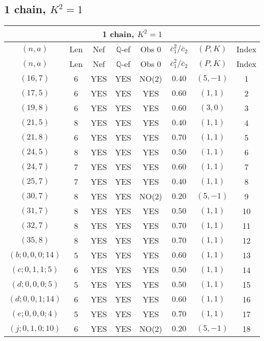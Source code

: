 \subsection{1 chain, $K^2 = 1$}
\begin{longtable}{|c|c|c|c|c|c|c|c|}
\hline
\multicolumn{8}{|c|}{1 chain, $K^2 = 1$}\\
\hline
$(n,a)$ & Len & Nef & $\mathbb Q$-ef & Obs 0 & $\overline c_1^2 / \overline c_2$ & $(P,K)$ & Index\\
\hline
\endfirsthead

\hline
$(n,a)$ & Len & Nef & $\mathbb Q$-ef & Obs 0 & $\overline c_1^2 / \overline c_2$ & $(P,K)$ & Index\\
\hline
\endhead
\hline
\endfoot

$(16,7)$ & 6 & YES & YES & NO(2) & $0.40$ & $(5,-1)$ & 1\\
$(17,5)$ & 6 & YES & YES & YES & $0.60$ & $(1,1)$ & 2\\
$(19,8)$ & 6 & YES & YES & YES & $0.60$ & $(3,0)$ & 3\\
$(21,5)$ & 8 & YES & YES & YES & $0.40$ & $(1,1)$ & 4\\
$(21,8)$ & 6 & YES & YES & YES & $0.70$ & $(1,1)$ & 5\\
$(24,5)$ & 8 & YES & YES & YES & $0.50$ & $(1,1)$ & 6\\
$(24,7)$ & 7 & YES & YES & YES & $0.60$ & $(1,1)$ & 7\\
$(25,7)$ & 7 & YES & YES & YES & $0.40$ & $(1,1)$ & 8\\
$(30,7)$ & 8 & YES & YES & NO(2) & $0.20$ & $(5,-1)$ & 9\\
$(31,7)$ & 8 & YES & YES & YES & $0.50$ & $(1,1)$ & 10\\
$(32,7)$ & 8 & YES & YES & YES & $0.70$ & $(1,1)$ & 11\\
$(35,8)$ & 8 & YES & YES & YES & $0.70$ & $(1,1)$ & 12\\
$(b;0,0,0;14)$ & 5 & YES & YES & YES & $0.60$ & $(1,1)$ & 13\\
$(c;0,1,1;5)$ & 6 & YES & YES & YES & $0.50$ & $(1,1)$ & 14\\
$(d;0,0,0;5)$ & 5 & YES & YES & YES & $0.50$ & $(1,1)$ & 15\\
$(d;0,0,1;14)$ & 6 & YES & YES & YES & $0.60$ & $(1,1)$ & 16\\
$(e;0,0,0;4)$ & 5 & YES & YES & YES & $0.70$ & $(1,1)$ & 17\\
$(j;0,1,0;10)$ & 6 & YES & YES & NO(2) & $0.20$ & $(5,-1)$ & 18
\end{longtable}
